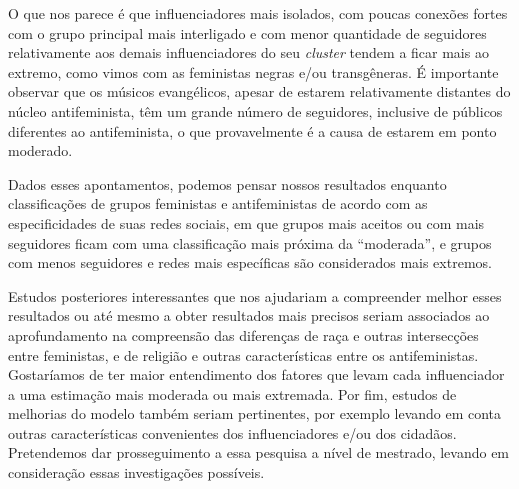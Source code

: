 \documentclass[
	12pt,				%
	openright,			%
	twoside,			%
	a4paper,			%
	english,			%
	brazil				%
	]{abntex2}
\begin{document}
 O que nos parece é que influenciadores mais isolados, com poucas conexões fortes com o grupo principal mais interligado e com menor quantidade de seguidores relativamente aos demais influenciadores do seu \textit{cluster} tendem a ficar mais ao extremo, como vimos com as feministas negras e/ou transgêneras. É importante observar que os músicos evangélicos, apesar de estarem relativamente distantes do núcleo antifeminista, têm um grande número de seguidores, inclusive de públicos diferentes ao antifeminista, o que provavelmente é a causa de estarem em ponto moderado.
 
 Dados esses apontamentos, podemos pensar nossos resultados enquanto classificações de grupos feministas e antifeministas de acordo com as especificidades de suas redes sociais, em que grupos mais aceitos ou com mais seguidores ficam com uma classificação mais próxima da ``moderada'', e grupos com menos seguidores e redes mais específicas são considerados mais extremos.
 
 Estudos posteriores interessantes que nos ajudariam a compreender melhor esses resultados ou até mesmo a obter resultados mais precisos seriam associados ao aprofundamento na compreensão das diferenças de raça e outras intersecções entre feministas, e de religião e outras características entre os antifeministas. Gostaríamos de ter maior entendimento dos fatores que levam cada influenciador a uma estimação mais moderada ou mais extremada. Por fim, estudos de melhorias do modelo também seriam pertinentes, por exemplo levando em conta outras características convenientes dos influenciadores e/ou dos cidadãos. Pretendemos dar prosseguimento a essa pesquisa a nível de mestrado, levando em consideração essas investigações possíveis.


 \postextual

 

%
%
\end{document}
